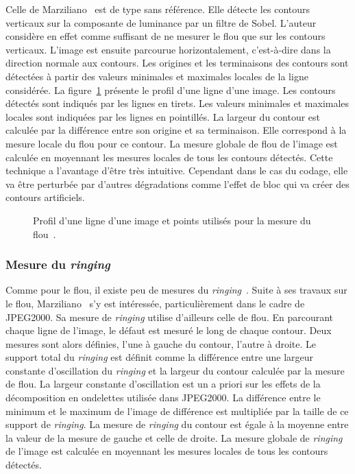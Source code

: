 Celle de Marziliano~\cite{marziliano-blurmetric} est de type sans référence. Elle détecte les contours verticaux sur la composante de luminance par un filtre de Sobel. L'auteur considère en effet comme suffisant de ne mesurer le flou que sur les contours verticaux. L'image est ensuite parcourue horizontalement, c'est-à-dire dans la direction normale aux contours. Les origines et les terminaisons des contours sont détectées à partir des valeurs minimales et maximales locales de la ligne considérée. La figure~\ref{fig:marzi} présente le profil d'une ligne d'une image. Les contours détectés sont indiqués par les lignes en tirets. Les valeurs minimales et maximales locales sont indiquées par les lignes en pointillés. La largeur du contour est calculée par la différence entre son origine et sa terminaison. Elle correspond à la mesure locale du flou pour ce contour. La mesure globale de flou de l'image est calculée en moyennant les mesures locales de tous les contours  détectés. Cette technique a l'avantage d'être très intuitive. Cependant dans le cas du codage, elle va être perturbée par d'autres dégradations comme l'effet de bloc qui va créer des contours artificiels.

\begin{figure}[htbp]
  \centering
  
  \caption{Profil d'une ligne d'une image et points utilisés pour la mesure du flou~\cite{marziliano-blurmetric}.}
  \label{fig:marzi}
\end{figure}


\subsubsection{Mesure du \emph{ringing}}
Comme pour le flou, il existe peu de mesures du \emph{ringing}~\cite{feng-spie2006}. Suite à ses travaux sur le flou, Marziliano~\cite{marziliano-ringingmetric} s'y est intéressée, particulièrement dans le cadre de JPEG2000. Sa mesure de \emph{ringing} utilise d'ailleurs celle de flou. En parcourant chaque ligne de l'image, le défaut est mesuré le long de chaque contour. Deux mesures sont alors définies, l'une à gauche du contour, l'autre à droite. Le support total du \emph{ringing} est définit comme la différence entre une largeur constante d'oscillation du \emph{ringing} et la largeur du contour calculée par la mesure de flou. La largeur constante d'oscillation est un a priori sur les effets de la décomposition en ondelettes utilisée dans JPEG2000. La différence entre le minimum et le maximum de l'image de différence est multipliée par la taille de ce support de \emph{ringing}. La mesure de \emph{ringing} du contour est égale à la moyenne entre la valeur de la mesure de gauche et celle de droite. La mesure globale de \emph{ringing} de l'image est calculée en moyennant les mesures locales de tous les contours détectés.

